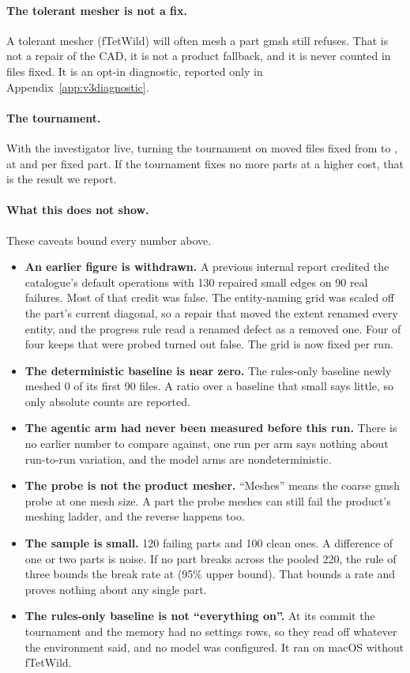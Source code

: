 \documentclass[11pt,onecolumn]{article}
\begin{document}
\paragraph{The tolerant mesher is not a fix.}
A tolerant mesher (fTetWild) will often mesh a part gmsh still refuses. That is not a repair of the
CAD, it is not a product fallback, and it is never counted in files fixed. It is an opt-in
diagnostic, reported only in Appendix~\ref{app:v3diagnostic}.

\vThreeOpsTable

\paragraph{The tournament.}
With the investigator live, turning the tournament on moved files fixed from
\vThreeTourOffFilesFixed{} to \vThreeTourOnFilesFixed{}, at \vThreeTourOffCostPerFixed{} and
\vThreeTourOnCostPerFixed{} per fixed part. If the tournament fixes no more parts at a higher cost,
that is the result we report.

\paragraph{What this does not show.}
These caveats bound every number above.
\begin{itemize}
\item \textbf{An earlier figure is withdrawn.} A previous internal report credited the catalogue's
  default operations with 130 repaired small edges on 90 real failures. Most of that credit was
  false. The entity-naming grid was scaled off the part's current diagonal, so a repair that moved
  the extent renamed every entity, and the progress rule read a renamed defect as a removed one.
  Four of four keeps that were probed turned out false. The grid is now fixed per run.
\item \textbf{The deterministic baseline is near zero.} The rules-only baseline newly meshed 0 of
  its first 90 files. A ratio over a baseline that small says little, so only absolute counts are
  reported.
\item \textbf{The agentic arm had never been measured before this run.} There is no earlier number
  to compare against, one run per arm says nothing about run-to-run variation, and the model arms
  are nondeterministic.
\item \textbf{The probe is not the product mesher.} ``Meshes'' means the coarse gmsh probe at one
  mesh size. A part the probe meshes can still fail the product's meshing ladder, and the reverse
  happens too.
\item \textbf{The sample is small.} 120 failing parts and 100 clean ones. A difference of one or two
  parts is noise. If no part breaks across the pooled 220, the rule of three bounds the break rate
  at \vThreeZeroBreakBound{} (95\% upper bound). That bounds a rate and proves nothing about any
  single part.
\item \textbf{The rules-only baseline is not ``everything on''.} At its commit the tournament and the
  memory had no settings rows, so they read off whatever the environment said, and no model was
  configured. It ran on macOS without fTetWild.
\end{itemize}
\end{document}
